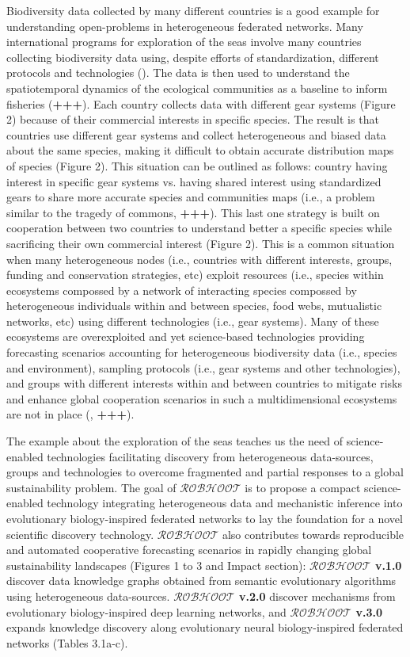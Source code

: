 \documentclass[11pt, a4paper]{article} %
\begin{document}
Biodiversity data collected by many different countries is a good
example for understanding open-problems in heterogeneous federated
networks. Many international programs for exploration of the seas
involve many countries collecting biodiversity data using, despite
efforts of standardization, different protocols and technologies
(\citep{ices}). The data is then used to understand the spatiotemporal
dynamics of the ecological communities as a baseline to inform
fisheries ({\bf +++}). Each country collects data with different gear
systems (Figure 2) because of their commercial interests in specific
species. The result is that countries use different gear systems and
collect heterogeneous and biased data about the same species, making
it difficult to obtain accurate distribution maps of species (Figure
2). This situation can be outlined as follows: country having interest
in specific gear systems vs. having shared interest using standardized
gears to share more accurate species and communities maps (i.e., a
problem similar to the tragedy of commons, {\bf +++}). This last one
strategy is built on cooperation between two countries to understand
better a specific species while sacrificing their own commercial
interest (Figure 2). This is a common situation when many
heterogeneous nodes (i.e., countries with different interests, groups,
funding and conservation strategies, etc) exploit resources (i.e.,
species within ecosystems compossed by a network of interacting
species compossed by heterogeneous individuals within and between
species, food webs, mutualistic networks, etc) using different
technologies (i.e., gear systems). Many of these ecosystems are
overexploited and yet science-based technologies providing forecasting
scenarios accounting for heterogeneous biodiversity data (i.e.,
species and environment), sampling protocols (i.e., gear systems and
other technologies), and groups with different interests within and
between countries to mitigate risks and enhance global cooperation
scenarios in such a multidimensional ecosystems are not in place
(\citep{Wilson2018}, {\bf +++}).

The example about the exploration of the seas teaches us the need of
science-enabled technologies facilitating discovery from heterogeneous
data-sources, groups and technologies to overcome fragmented and
partial responses to a global sustainability problem. The goal of
$\mathcal{ROBHOOT}$ is to propose a compact science-enabled technology
integrating heterogeneous data and mechanistic inference into
evolutionary biology-inspired federated networks to lay the foundation
for a novel scientific discovery technology. $\mathcal{ROBHOOT}$ also
contributes towards reproducible and automated cooperative forecasting
scenarios in rapidly changing global sustainability landscapes
(Figures 1 to 3 and Impact section): {\bf $\mathcal{ROBHOOT}$ v.1.0}
discover data knowledge graphs obtained from semantic evolutionary
algorithms using heterogeneous data-sources. {\bf $\mathcal{ROBHOOT}$
  v.2.0} discover mechanisms from evolutionary biology-inspired deep
learning networks, and {\bf $\mathcal{ROBHOOT}$ v.3.0} expands
knowledge discovery along evolutionary neural biology-inspired
federated networks (Tables 3.1a-c).
\end{document}
